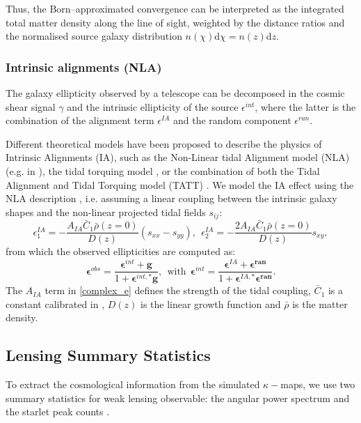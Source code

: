 \documentclass[twocolumn,twocolappendix]{aastex63}
\begin{document}
Thus, the Born–approximated convergence can be interpreted as the integrated total matter density along the line of sight, weighted by the distance ratios and the normalised source galaxy  distribution $n(\chi)$d$\chi=n(z)$d$z$.

\subsubsection{Intrinsic alignments (NLA)}

The galaxy ellipticity observed by a telescope can be decomposed in the cosmic shear signal $\gamma$ and the intrinsic ellipticity of the source $\epsilon^{int}$, where the latter is the combination of the alignment term $\epsilon^{IA}$ and the random component $\epsilon^{ran}$.

Different theoretical models have been proposed to describe the physics of Intrinsic Alignments (IA), such as the Non-Linear tidal Alignment model (NLA) (e.g. in \citet{Bridle_2007}), the tidal torquing model \citep{PhysRevD.70.063526, 10.1046/j.1365-8711.2001.04105.x}, or the combination of both the Tidal Alignment and Tidal Torquing model (TATT)  \citep{PhysRevD.100.103506}.
We model the IA effect using the NLA description \citep{harnois2021cosmic}, i.e. assuming a linear coupling between the intrinsic galaxy shapes and the non-linear projected tidal fields $s_{ij}$:
\begin{equation}\label{complex_e}
    \epsilon_{1}^{IA}=- \frac{A_{IA}\bar{C}_1\bar{\rho}(z=0)}{D(z)} (s_{xx}-s_{yy}), \ \ 
      \epsilon_{2}^{IA}=-\frac{2A_{IA}\bar{C}_1\bar{\rho}(z=0)}{D(z)} s_{xy},
\end{equation}
from which the observed ellipticities are computed as:
 \begin{equation}
    \boldsymbol{\epsilon}^{obs}=
    \frac{\boldsymbol{\epsilon}^{int}+\textbf{g}}{1+\boldsymbol{\epsilon}^{int,*}\textbf{g}}, \ \  \text{with}  \ \
    \boldsymbol{\epsilon}^{int}=
    \frac{\boldsymbol{\epsilon}^{
     IA}+\boldsymbol{\epsilon^{ran}}}
     {1+\boldsymbol{\epsilon}^{IA,*}\boldsymbol{\epsilon^{ran}}}.
\end{equation}
The $A_{IA}$ term in \autoref{complex_e} defines the strength of the tidal coupling, $\bar{C}_1$ is a constant
calibrated in \citet{brown2002measurement}, $D(z)$ is the linear growth function and $\bar{\rho}$ is the matter density.
 
\subsection{Lensing Summary Statistics }\label{stat}
To extract the cosmological information from the simulated $\kappa-$maps, we use two summary statistics for weak lensing observable: the angular power spectrum and the starlet peak counts \citep{lin2016new}. 
\end{document}
